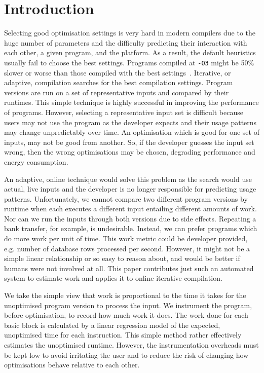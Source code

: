 \section{Introduction}

    Selecting good optimisation settings is very hard in modern compilers due to the huge number of parameters and the difficulty predicting their interaction with each other, a given program, and the platform. 
    As a result, the default heuristics usually fail to choose the best settings. 
    Programs compiled at \texttt{-O3} might be 50\% slower or worse than those compiled with the best settings~\cite{??}.
    Iterative, or adaptive, compilation searches for the best compilation settings. 
    Program versions are run on a set of representative inputs and compared by their runtimes.
    This simple technique is highly successful in improving the performance of programs.    
    However, selecting a representative input set is difficult because users may not use the program as the developer expects and their usage patterns may change unpredictably over time.
    An optimisation which is good for one set of inputs, may not be good from another. 
    So, if the developer guesses the input set wrong, then the wrong optimisations may be chosen, degrading performance and energy consumption.

    An adaptive, online technique would solve this problem as the search would use actual, live inputs and the developer is no longer responsible for predicting usage patterns. 
    Unfortunately, we cannot compare two different program versions by runtime when each executes a different input entailing different amounts of work.
    Nor can we run the inputs through both versions due to side effects. Repeating a bank transfer, for example, is undesirable.
    Instead, we can prefer programs which do more work per unit of time. 
    This work metric could be developer provided, e.g. number of database rows processed per second. 
    However, it might not be a simple linear relationship or so easy to reason about, and would be better if humans were not involved at all.    
    This paper contributes just such an automated system to estimate work and applies it to online iterative compilation.
    
    We take the simple view that work is proportional to the time it takes for the unoptimised program version to process the input.
    We instrument the program, before optimisation, to record how much work it does. 
    The work done for each basic block is calculated by a linear regression model of the expected, unoptimised time for each instruction.
    This simple method rather effectively estimates the unoptimised runtime.
    However, the instrumentation overheads must be kept low to avoid irritating the user and to reduce the risk of changing how optimisations behave relative to each other.

